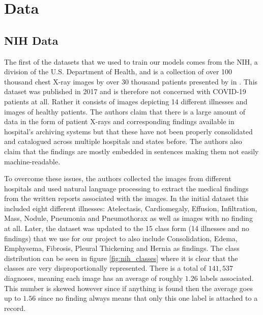 \chapter{Data}\label{chapter:data}

\section{NIH Data}\label{data:nih}

The first of the datasets that we used to train our models comes from the \acf{NIH}, a division of the U.S. Department of Health, and is a collection of over 100 thousand chest X-ray images by over 30 thousand patients presented by \citeauthor{wang_chestx-ray8_2017} in \autocite{wang_chestx-ray8_2017}. This dataset was published in 2017 and is therefore not concerned with COVID-19 patients at all. Rather it consists of images depicting 14 different illnesses and images of healthy patients. The authors claim that there is a large amount of data in the form of patient X-rays and corresponding findings available in hospital's archiving systems but that these have not been properly consolidated and catalogued across multiple hospitals and states before. The authors also claim that the findings are mostly embedded in sentences making them not easily machine-readable.

To overcome these issues, the authors collected the images from different hospitals and used natural language processing to extract the medical findings from the written reports associated with the images. In the initial dataset this included eight different illnesses: Atelectasis, Cardiomegaly, Effusion, Infiltration, Mass, Nodule, Pneumonia and Pneumothorax as well as images with no finding at all. Later, the dataset was updated to the 15 class form (14 illnesses and no findings) that we use for our project to also include Consolidation, Edema, Emphysema, Fibrosis, Pleural Thickening and Hernia as findings. The class distribution can be seen in figure \vref{fig:nih_classes} where it is clear that the classes are very disproportionally represented. There is a total of $141,537$ diagnoses, meaning each image has an average of roughly $1.26$ labels associated. This number is skewed however since if anything is found then the average goes up to $1.56$ since no finding always means that only this one label is attached to a record.

